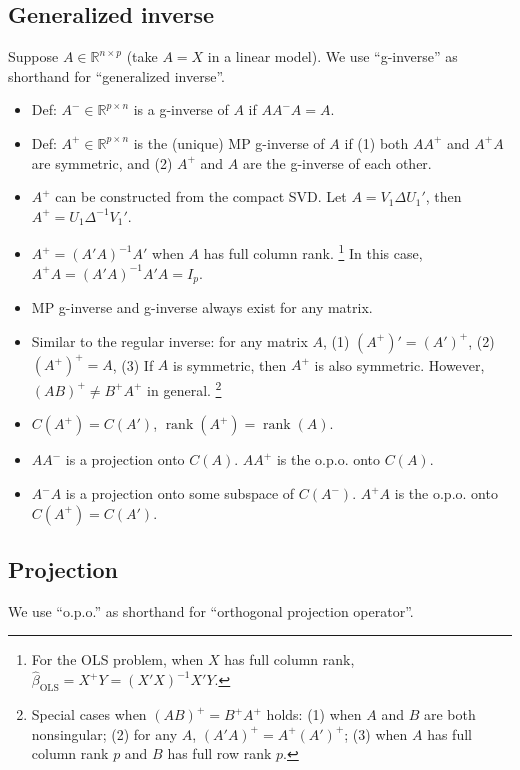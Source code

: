\documentclass{article}
\theoremstyle{break}
\newcommand{\R}{\ensuremath{\mathbb{R}}}
\DeclareMathOperator{\rank}{rank}
\begin{document}
\subsection{Generalized inverse}\label{sec:prelim-lm-g-inverse}
Suppose $A \in \R^{n \times p}$ (take $A = X$ in a linear model). 
We use ``g-inverse'' as shorthand for ``generalized inverse''.
\begin{itemize}
    \item Def: $A^- \in \R^{p \times n}$ is a g-inverse of $A$ if $AA^- A = A$. 
    \item Def: $A^+ \in \R^{p \times n}$ is the (unique) MP g-inverse of $A$ if (1) both $AA^+$ and $A^+ A$ are symmetric, and (2) $A^+$ and $A$ are the g-inverse of each other.
    \item $A^+$ can be constructed from the compact SVD. Let $A = V_1 \Delta U_1'$, then $A^+ = U_1 \Delta^{-1} V_1'$.
    \item $A^+ = (A'A)^{-1}A'$ when $A$ has full column rank. 
    \footnote{For the OLS problem, when $X$ has full column rank, $\hat{\beta}_{\mathrm{OLS}} = X^+ Y = (X'X)^{-1} X'Y$.}
    In this case, $A^+ A = (A'A)^{-1}A'A = I_p.$
    \item MP g-inverse and g-inverse always exist for any matrix.
    \item Similar to the regular inverse: for any matrix $A$, (1) $(A^+)' = (A')^+$, (2) $(A^+)^+ = A$, (3) If $A$ is symmetric, then $A^+$ is also symmetric. However, $(AB)^+ \neq B^+ A^+$ in general. 
    \footnote{Special cases when $(AB)^+ = B^+ A^+$ holds: (1) when $A$ and $B$ are both nonsingular; (2) for any $A$, $(A'A)^+ = A^+(A')^+$; (3) when $A$ has full column rank $p$ and $B$ has full row rank $p$.}
    \item $C(A^+) = C(A')$, $\rank(A^+) = \rank(A)$.
    \item $AA^-$ is a projection onto $C(A)$. $AA^+$ is the o.p.o. onto $C(A)$.
    \item $A^- A$ is a projection onto some subspace of $C(A^-)$. $A^+ A$ is the o.p.o. onto $C(A^+) = C(A')$.
\end{itemize}


\subsection{Projection}\label{sec:prelim-lm-projection}
We use ``o.p.o.'' as shorthand for ``orthogonal projection operator''.
\end{document}

